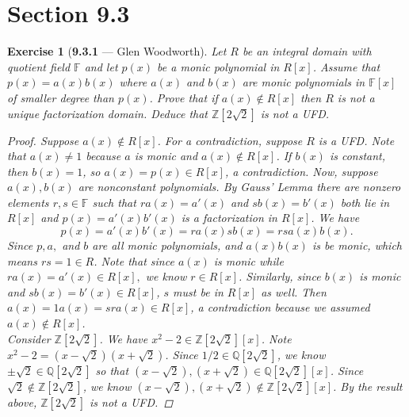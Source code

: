 \documentclass[12pt]{amsart}
\newtheorem{exercise}[theorem]{Exercise}
\theoremstyle{remark}
\newcommand{\ZZ}{{\mathbb Z}}
\newcommand{\QQ}{{\mathbb Q}}
\newcommand{\FF}{{\mathbb F}}
\theoremstyle{mycomment}
\begin{document}
   


\section*{Section 9.3}



\begin{exercise}[\textbf{9.3.1} --- Glen Woodworth]Let $R$ be an integral domain with quotient field $\FF$ and let $p(x)$ be a monic polynomial in $R[x]$. Assume that $p(x)=a(x)b(x)$ where $a(x)$ and $b(x)$ are monic polynomials in $\FF[x]$ of smaller degree than $p(x)$. Prove that if $a(x)\notin R[x]$ then $R$ is not a unique factorization domain. Deduce that $\ZZ[2\sqrt{2}]$ is not a UFD. 
  \begin{proof}
 Suppose $a(x)\notin R[x]$. For a contradiction, suppose $R$ is a UFD. Note that $a(x)\ne 1$ because $a$ is monic and $a(x)\notin R[x]$. If $b(x)$ is constant, then $b(x)=1$, so $a(x)=p(x)\in R[x]$, a contradiction. Now, suppose $a(x),b(x)$ are nonconstant polynomials. By Gauss' Lemma there are nonzero elements $r,s\in\FF$ such that $ra(x)=a'(x)$ and $sb(x)=b'(x)$ both lie in $R[x]$ and $p(x)=a'(x)b'(x)$ is a factorization in $R[x]$.  We have 
 \[p(x)=a'(x)b'(x)=ra(x)sb(x)=rsa(x)b(x).\]
 Since $p,a,$ and $b$ are all monic polynomials, and $a(x)b(x)$ is be monic, which means $rs=1\in R$. Note that since $a(x)$ is monic while $ra(x)=a'(x)\in R[x],$ we know $r\in R[x]$. Similarly, since $b(x)$ is monic and $sb(x)=b'(x)\in R[x]$, $s$ must be in $R[x]$ as well. Then $a(x)=1a(x)=sra(x)\in R[x]$, a contradiction because we assumed $a(x)\notin R[x]$.  \\
 Consider $\ZZ[2\sqrt{2}]$. We have $x^2-2\in\ZZ[2\sqrt{2}][x]$. Note $x^2-2=(x-\sqrt{2})(x+\sqrt{2})$.
 Since $1/2\in\QQ[2\sqrt{2}]$, we know $\pm\sqrt{2}\in\QQ[2\sqrt{2}]$ so that $(x-\sqrt{2}),(x+\sqrt{2})\in\QQ[2\sqrt{2}][x]$. Since $\sqrt{2}\notin\ZZ[2\sqrt{2}]$, we know $(x-\sqrt{2}),(x+\sqrt{2})\notin\ZZ[2\sqrt{2}][x]$. By the result above, $\ZZ[2\sqrt{2}]$ is not a UFD.
   \end{proof}
 \end{exercise}
 \vspace{.15in}
\end{document}
